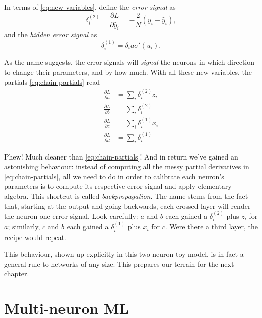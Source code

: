 \documentclass[11pt,a4paper,oneside]{book}
\theoremstyle{definition}
\theoremstyle{plain}
\theoremstyle{remark}
\begin{document}
In terms of \eqref{eq:new-variables}, define the {\it error signal} as
\begin{equation}
    \label{eq:2neuron-error-signal}
    \delta^{(2)}_i=\frac{\partial L}{\partial\hat y_i} = -\frac{2}{N}(y_i-\hat y_i),
\end{equation}
and the {\it hidden error signal} as
\begin{equation}
    \label{eq:2neuron-hidden-error-signal}
    \delta^{(1)}_i=\delta_i a \sigma'(u_i).
\end{equation}

As the name suggests, the error signals will {\it signal} the neurons in which direction to change their parameters, and by how much. With all these new variables, the partials \eqref{eq:chain-partials} read
\begin{equation}
    \label{eq:new-chain-partials}
    \begin{split}
        \frac{\partial L}{\partial a} &= \sum_i\delta^{(2)}_i z_i\\
        \frac{\partial L}{\partial b} &= \sum_i\delta^{(2)}_i\\
        \frac{\partial L}{\partial c} &= \sum_i\delta^{(1)}_i x_i\\
        \frac{\partial L}{\partial d} &= \sum_i\delta^{(1)}_i
    \end{split}
\end{equation}

Phew! Much cleaner than \eqref{eq:chain-partials}! And in return we've gained an astonishing behaviour: instead of computing all the messy partial derivatives in \eqref{eq:chain-partials}, all we need to do in order to calibrate each neuron's parameters is to compute its respective error signal and apply elementary algebra. This shortcut is called {\it backpropagation}. The name stems from the fact that, starting at the output and going backwards, each crossed layer will render the neuron one error signal. Look carefully: $a$ and $b$ each gained a $\delta^{(2)}_i$ plus $z_i$ for $a$; similarly, $c$ and $b$ each gained a $\delta^{(1)}_i$ plus $x_i$ for $c$. Were there a third layer, the recipe would repeat.

This behaviour, shown up explicitly in this two-neuron toy model, is in fact a general rule to networks of any size. This prepares our terrain for the next chapter.


\chapter{Multi-neuron ML}
\label{chap:mlp}
\end{document}
